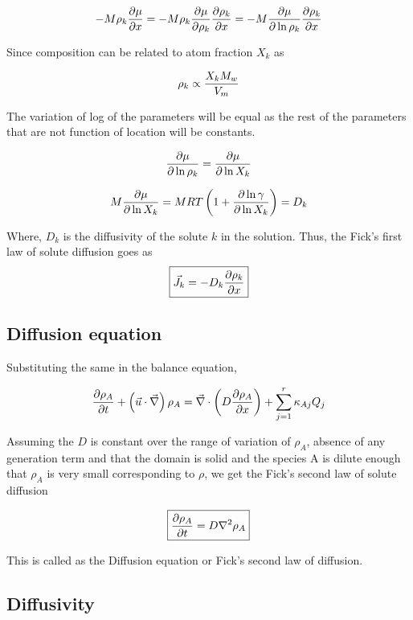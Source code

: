 $$ -M \rho_k {\partial \mu \over \partial x} = - M \rho_k {\partial \mu \over \partial
\rho_k}{\partial \rho_k \over \partial x} = -M{\partial \mu \over \partial \ln \rho_k}{\partial
\rho_k \over \partial x} $$

Since composition can be related to atom fraction $X_k$ as 

$$ \rho_k \propto {X_k M_w \over V_m } $$ 

The variation of log of the parameters will be equal as the rest of the parameters that are not function of location will be constants.

$${\partial \mu \over \partial \ln \rho_k} = {\partial \mu \over \partial \ln X_k}$$

$$ M{\partial \mu \over \partial \ln X_k} = MRT \left( 1 + {\partial \ln \gamma
\over \partial \ln X_k} \right) = D_k $$

Where, $D_k$ is the diffusivity of the solute $k$ in the solution. Thus, the Fick's
first law of solute diffusion goes as
\begin{equation}
\boxed{
  \vec{J}_k = -D_k {\partial \rho_k \over \partial x}
}
\label{ficks-1}
\end{equation}

\subsection{Diffusion equation}

Substituting the same in the balance equation,

\begin{equation}
{\partial \rho_A \over \partial t} + \left( \vec{u} \cdot \vec{\nabla} \right) \rho_A =
\vec{\nabla} \cdot \left( D {\partial \rho_A \over \partial x} \right) + \sum_{j=1}^{r}{\kappa_{Aj}Q_j}
\end{equation}

Assuming the $D$ is constant over the range of variation of $\rho_A$, absence of any
generation term and that the domain is solid and the species A is dilute enough that $\rho_A$ is very small corresponding to $\rho$, we get the Fick's second law of
solute diffusion

\begin{equation}
\boxed{
{\partial \rho_A \over \partial t} = D \nabla^2 \rho_A
}
\end{equation}

This is called as the Diffusion equation or Fick's second law of diffusion.

\subsection{Diffusivity}

